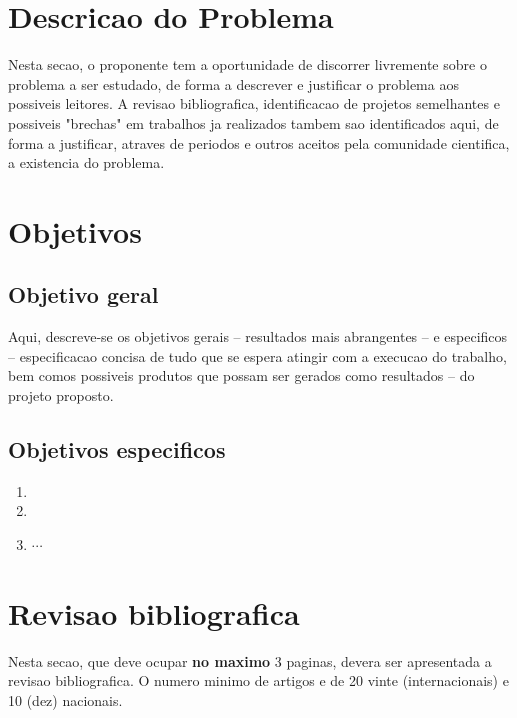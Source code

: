 \documentclass[a4paper,11pt]{article}
\begin{document}
\section{Descricao do Problema}
Nesta secao, o proponente tem a oportunidade de discorrer livremente sobre o problema a ser estudado, de forma a descrever e justificar o problema aos possiveis leitores.  A revisao bibliografica, identificacao de projetos semelhantes e possiveis "brechas" em trabalhos ja realizados tambem sao identificados aqui, de forma a justificar, atraves de periodos e outros aceitos pela comunidade cientifica, a existencia do problema.

\section{Objetivos}

\subsection{Objetivo geral}
Aqui, descreve-se os objetivos gerais -- resultados mais abrangentes -- e especificos -- especificacao concisa de tudo que se espera atingir com a execucao do trabalho, bem comos possiveis produtos que possam ser gerados como resultados -- do projeto proposto. 

\subsection{Objetivos especificos}

\begin{enumerate}
\item 
\item 
 \item $\cdots$

\end{enumerate}

\section{Revisao bibliografica}
Nesta secao, que deve ocupar \textbf{no maximo} 3 paginas, devera ser apresentada a revisao bibliografica. O numero minimo de artigos e de 20 vinte (internacionais) e 10 (dez) nacionais.
\end{document}
